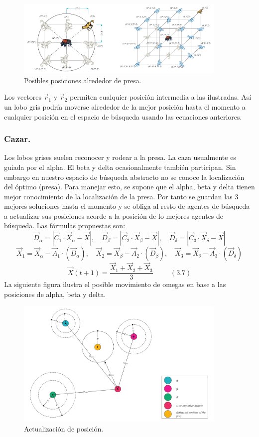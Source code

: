 \documentclass[11pt,a4paper]{article}
\theoremstyle{definition}
\begin{document}
	\begin{figure}[H]
		\centering
		\includegraphics[width=0.9\textwidth]{images/2d_3d.png}
		\caption{Posibles posiciones alrededor de presa.}
	\end{figure}
	
	Los vectores $\vec{r}_1$ y $\vec{r}_2$ permiten cualquier posición intermedia a las ilustradas. Así un lobo gris podría moverse alrededor de la mejor posición hasta el momento a cualquier posición en el espacio de búsqueda usando las ecuaciones anteriores.
	\subsubsection{Cazar.}
	Los lobos grises suelen reconocer y rodear a la presa. La caza usualmente es guiada por el alpha. El beta y delta ocasionalmente también participan. Sin embargo en nuestro espacio de búsqueda abstracto no se conoce la localización del óptimo (presa). Para manejar esto, se supone que el alpha, beta y delta tienen mejor conocimiento de la localización de la presa. Por tanto se guardan las 3 mejores soluciones hasta el momento y se obliga al resto de agentes de búsqueda a actualizar sus posiciones acorde a la posición de lo mejores agentes de búsqueda. Las fórmulas propuestas son:
	$$\vec{D}_{\alpha} = |\vec{C}_1\cdot \vec{X}_{\alpha} - \vec{X}|, \quad \vec{D}_{\beta} = | \vec{C}_2\cdot \vec{X}_{\beta}-\vec{X}|, \quad \vec{D}_{\delta} = |\vec{C}_3\cdot \vec{X}_{\delta} - \vec{X}|$$
	$$\vec{X}_1 = \vec{X}_{\alpha} - \vec{A}_1 \cdot (\vec{D}_{\alpha}), \quad \vec{X}_2 = \vec{X}_{\beta} - \vec{A}_2 \cdot (\vec{D}_{\beta}), \quad \vec{X}_3=\vec{X}_{\delta} - \vec{A}_3 \cdot (\vec{D}_{\delta})$$
	$$\vec{X} (t+1) = \frac{\vec{X}_1 + \vec{X}_2 + \vec{X}_3}{3} \quad \quad \ \ (3.7)$$
	La siguiente figura ilustra el posible movimiento de omegas en base a las posiciones de alpha, beta y delta.
	
	\begin{figure}[H]
		\centering
		\includegraphics[width=0.9\textwidth]{images/omega_movement.png}
		\caption{Actualización de posición.}
	\end{figure}
\end{document}
